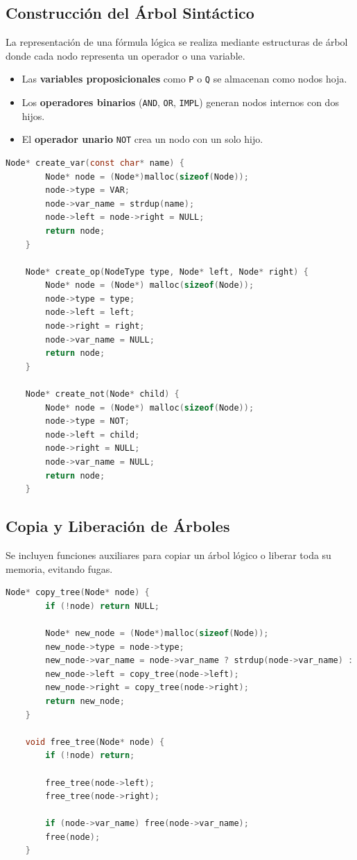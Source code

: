 \documentclass{report}
\begin{document}
	\subsection{Construcción del Árbol Sintáctico}

	La representación de una fórmula lógica se realiza mediante estructuras de árbol donde cada nodo representa un operador o una variable.

	\begin{itemize}
		\item Las \textbf{variables proposicionales} como \texttt{P} o \texttt{Q} se almacenan como nodos hoja.
		\item Los \textbf{operadores binarios} (\texttt{AND}, \texttt{OR}, \texttt{IMPL}) generan nodos internos con dos hijos.
		\item El \textbf{operador unario} \texttt{NOT} crea un nodo con un solo hijo.
	\end{itemize}

	\begin{lstlisting}[language=C, caption={Creación de nodos para el árbol sintáctico}]
	Node* create_var(const char* name) {
		Node* node = (Node*)malloc(sizeof(Node));
		node->type = VAR;
		node->var_name = strdup(name);
		node->left = node->right = NULL;
		return node;
	}

	Node* create_op(NodeType type, Node* left, Node* right) {
		Node* node = (Node*) malloc(sizeof(Node));
		node->type = type;
		node->left = left;
		node->right = right;
		node->var_name = NULL;
		return node;
	}

	Node* create_not(Node* child) {
		Node* node = (Node*) malloc(sizeof(Node));
		node->type = NOT;
		node->left = child;
		node->right = NULL;
		node->var_name = NULL;
		return node;
	}
	\end{lstlisting}

	\subsection{Copia y Liberación de Árboles}

	Se incluyen funciones auxiliares para copiar un árbol lógico o liberar toda su memoria, evitando fugas.

	\begin{lstlisting}[language=C, caption={Copia y liberación de árboles lógicos}]
	Node* copy_tree(Node* node) {
		if (!node) return NULL;

		Node* new_node = (Node*)malloc(sizeof(Node));
		new_node->type = node->type;
		new_node->var_name = node->var_name ? strdup(node->var_name) : NULL;
		new_node->left = copy_tree(node->left);
		new_node->right = copy_tree(node->right);
		return new_node;
	}

	void free_tree(Node* node) {
		if (!node) return;

		free_tree(node->left);
		free_tree(node->right);

		if (node->var_name) free(node->var_name);
		free(node);
	}
	\end{lstlisting}
\end{document}
